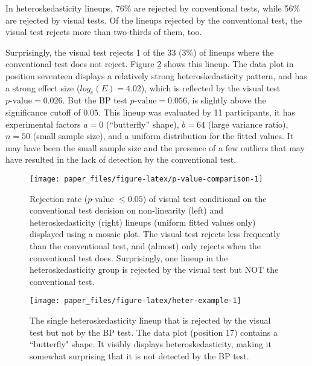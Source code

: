 \documentclass[]{interact}
\theoremstyle{plain}%
\theoremstyle{definition}
\theoremstyle{remark}
\begin{document}
In heteroskedasticity lineups, 76\% are rejected by conventional tests,
while 56\% are rejected by visual tests. Of the lineups rejected by the
conventional test, the visual test rejects more than two-thirds of them,
too.

Surprisingly, the visual test rejects 1 of the 33 (3\%) of lineups where
the conventional test does not reject. Figure \ref{fig:heter-example}
shows this lineup. The data plot in position seventeen displays a
relatively strong heteroskedasticity pattern, and has a strong effect
size (\(log_e(E)=4.02\)), which is reflected by the visual test
\(p\text{-value} = 0.026\). But the BP test \(p\text{-value} = 0.056\),
is slightly above the significance cutoff of \(0.05\). This lineup was
evaluated by 11 participants, it has experimental factors \(a = 0\)
(``butterfly'' shape), \(b = 64\) (large variance ratio), \(n = 50\)
(small sample size), and a uniform distribution for the fitted values.
It may have been the small sample size and the presence of a few
outliers that may have resulted in the lack of detection by the
conventional test.

\begin{figure}

{\centering \texttt{[image: paper\_files/figure-latex/p-value-comparison-1]} 

}

\caption{Rejection rate ($p$-value $\leq0.05$) of visual test conditional on the conventional test decision on non-linearity (left) and heteroskedasticity (right) lineups (uniform fitted values only) displayed using a mosaic plot. The visual test rejects less frequently than the conventional test, and (almost) only rejects when the conventional test does. Surprisingly, one lineup in the heteroskedasticity group is rejected by the visual test but NOT the conventional test.}\label{fig:p-value-comparison}
\end{figure}

\begin{figure}[t!]

{\centering \texttt{[image: paper\_files/figure-latex/heter-example-1]} 

}

\caption{The single heteroskedasticity lineup that is rejected by the visual test but not by the BP test. The data plot (position 17) contains a ``butterfly" shape. It visibly displays heteroskedasticity, making it somewhat surprising that it is not detected by the BP test.}\label{fig:heter-example}
\end{figure}
\end{document}

